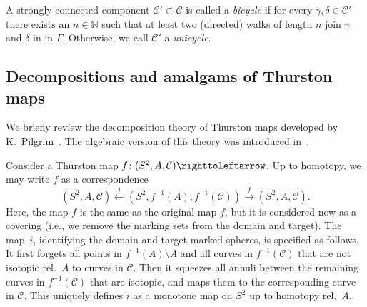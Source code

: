 \documentclass{amsart}
\theoremstyle{plain}
\theoremstyle{definition}
\theoremstyle{remark}
\newcommand{\N}{{\mathbb N}}
\newcommand{\CC}{{\mathcal C}}
\newcommand\selfmap{\righttoleftarrow}
\begin{document}
A strongly connected component $\CC'\subset \CC$ is called a \emph{bicycle} if for every $\gamma,\delta\in \CC'$ there exists an $n\in \N$ such that at least two (directed) walks of length $n$ join $\gamma$ and $\delta$ in in $\Gamma$.  Otherwise, we call $\CC'$ a \emph{unicycle}. 


\subsection{Decompositions and amalgams of Thurston maps} 
\label{ss: dec and amal}

We briefly review the decomposition theory of Thurston maps developed by K.~Pilgrim~\cite{Pilgrim_Comb}. The algebraic version of this theory was introduced in~\cite{BD_Dec}.




Consider a Thurston map $f\colon(S^2,A,\CC)\selfmap$. Up to homotopy, we may write $f$ as a correspondence
\begin{equation}
\label{eq:corr:f_i}(S^2,A,\CC)\overset i\leftarrow(S^2,f^{-1}(A),f^{-1}(\CC))\overset
f\to(S^2,A,\CC).
\end{equation}
Here, the map $f$ is the same as the original map $f$, but it is considered now as a covering (i.e., we remove the marking sets from the domain and target). %
The map~$i$, identifying the domain and target marked spheres, is specified as follows. It first forgets all points in $f^{-1}(A)\setminus A$ and all curves in $f^{-1}(\CC)$ that
are not isotopic rel.\ $A$ to curves in $\CC$. Then it squeezes all annuli between
the remaining curves in $f^{-1}(\CC)$ that are isotopic, and maps them to the corresponding curve in
$\CC$. This uniquely defines $i$ as a monotone 
map on $S^2$ up to homotopy rel.\ $A$.

\end{document}
